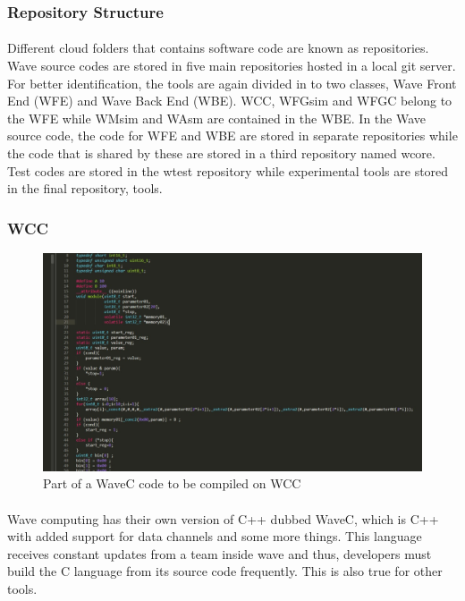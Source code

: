 \subsubsection{Repository Structure}
\paragraph{}
Different cloud folders that contains software code are known as repositories. Wave source codes are stored in five main repositories hosted in a local git server. For better identification, the tools are again divided in to two classes, Wave Front End (WFE) and Wave Back End (WBE). WCC, WFGsim and WFGC belong to the WFE while WMsim and WAsm are contained in the WBE. In the Wave source code, the code for WFE and WBE are stored in separate repositories while the code that is shared by these are stored in a third repository named wcore. Test codes are stored in the wtest repository while experimental tools are stored in the final repository, tools.

\subsubsection{WCC}

\begin{figure}[h]
    \centering
    \includegraphics[trim=0cm 0cm 0cm 0cm, clip=true,scale=0.5]{figures/wavec.jpg}
    \caption{Part of a WaveC code to be compiled on WCC\label{Fig:wavec}}\vspace{-4mm}
    \end{figure}

\paragraph{}
Wave computing has their own version of C++ dubbed WaveC, which is C++ with added support for data channels and some more things. This language receives constant updates from a team inside wave and thus, developers must build the C language from its source code frequently. This is also true for other tools.

